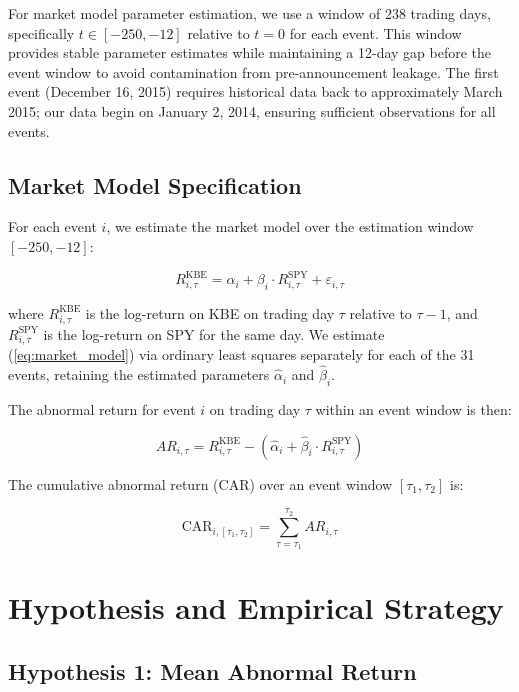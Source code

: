 \documentclass[11pt]{article}
\begin{document}
For market model parameter estimation, we use a window of 238 trading days, specifically $t \in [-250, -12]$ relative to $t = 0$ for each event. This window provides stable parameter estimates while maintaining a 12-day gap before the event window to avoid contamination from pre-announcement leakage. The first event (December 16, 2015) requires historical data back to approximately March 2015; our data begin on January 2, 2014, ensuring sufficient observations for all events.

\subsection{Market Model Specification}

For each event $i$, we estimate the market model over the estimation window $[-250, -12]$:

\begin{equation}
R_{i,\tau}^{\text{KBE}} = \alpha_i + \beta_i \cdot R_{i,\tau}^{\text{SPY}} + \varepsilon_{i,\tau}
\label{eq:market_model}
\end{equation}

where $R_{i,\tau}^{\text{KBE}}$ is the log-return on KBE on trading day $\tau$ relative to $\tau-1$, and $R_{i,\tau}^{\text{SPY}}$ is the log-return on SPY for the same day. We estimate (\ref{eq:market_model}) via ordinary least squares separately for each of the 31 events, retaining the estimated parameters $\hat{\alpha}_i$ and $\hat{\beta}_i$.

The abnormal return for event $i$ on trading day $\tau$ within an event window is then:

\begin{equation}
AR_{i,\tau} = R_{i,\tau}^{\text{KBE}} - \left( \hat{\alpha}_i + \hat{\beta}_i \cdot R_{i,\tau}^{\text{SPY}} \right)
\label{eq:abnormal_return}
\end{equation}

The cumulative abnormal return (CAR) over an event window $[\tau_1, \tau_2]$ is:

\begin{equation}
\text{CAR}_{i, [\tau_1, \tau_2]} = \sum_{\tau=\tau_1}^{\tau_2} AR_{i,\tau}
\label{eq:car}
\end{equation}

\section{Hypothesis and Empirical Strategy}

\subsection{Hypothesis 1: Mean Abnormal Return}
\end{document}
